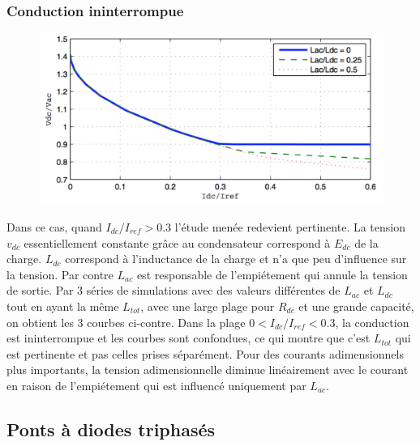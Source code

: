 		\subsubsection{Conduction ininterrompue}
			\begin{figure}
			\vspace{-5mm}
			\includegraphics[scale=0.3]{ch2/17}
			\end{figure} 
			Dans ce cas, quand $I_{dc}/I_{ref}>0.3$ l'étude menée redevient pertinente. La tension $v_{dc}$ essentiellement constante grâce au condensateur correspond à $E_{dc}$ de la charge. $L_{dc}$ correspond à l'inductance de la charge et n'a que peu d'influence sur la tension. Par contre $L_{ac}$ est responsable de l'empiétement qui annule la tension de sortie. Par 3 séries de simulations avec des valeurs différentes de $L_{ac}$ et $L_{dc}$ tout en ayant la même $L_{tot}$, avec une large plage pour $R_{dc}$ et une grande capacité, on obtient les 3 courbes ci-contre. Dans la plage $0<I_{dc}/I_{ref}<0.3$, la conduction est ininterrompue et les courbes sont confondues, ce qui montre que c'est $L_{tot}$ qui est pertinente et pas celles prises séparément. Pour des courants adimensionnels plus importants, la tension adimensionnelle diminue linéairement avec le courant en raison de l'empiétement qui est influencé uniquement par $L_{ac}$.
			
	\subsection{Ponts à diodes triphasés}
	
